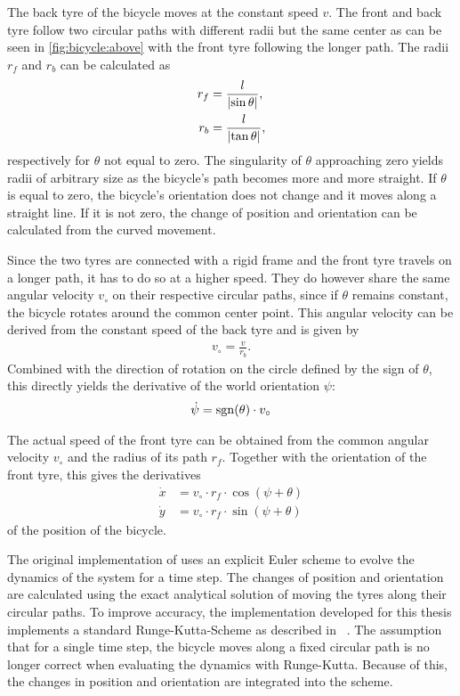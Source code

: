 The back tyre of the bicycle moves at the constant speed $v$.
The front and back tyre follow two circular paths with different radii but the same center as can be seen in \cref{fig:bicycle:above} with the front tyre following the longer path.
The radii $r_f$ and $r_b$ can be calculated as
\begin{align}
    r_f &= \frac{l}{\abs*{\sin \theta}}, \\
    r_b &= \frac{l}{\abs*{\tan \theta}},
\end{align}
respectively for $\theta$ not equal to zero.
The singularity of $\theta$ approaching zero yields radii of arbitrary size as the bicycle's path becomes more and more straight.
If $\theta$ is equal to zero, the bicycle's orientation does not change and it moves along a straight line.
If it is not zero, the change of position and orientation can be calculated from the curved movement.

Since the two tyres are connected with a rigid frame and the front tyre travels on a longer path, it has to do so at a higher speed.
They do however share the same angular velocity $v_\circ$ on their respective circular paths, since if $\theta$ remains constant, the bicycle rotates around the common center point.
This angular velocity can be derived from the constant speed of the back tyre and is given by
\begin{align}
    v_\circ = \frac{v}{r_b}.
\end{align}
Combined with the direction of rotation on the circle defined by the sign of $\theta$, this directly yields the derivative of the world orientation $\psi$:
\begin{align}
    \dot{\psi} = \sgn(\theta) \cdot v_\circ
\end{align}

The actual speed of the front tyre can be obtained from the common angular velocity $v_\circ$ and the radius of its path $r_f$.
Together with the orientation of the front tyre, this gives the derivatives
\begin{align}
    \dot{x} &= v_\circ \cdot r_f \cdot \cos(\psi + \theta) \\
    \dot{y} &= v_\circ \cdot r_f \cdot \sin(\psi + \theta)
\end{align}
of the position of the bicycle.

The original implementation of \citeauthor{randlov_learning_1998} uses an explicit Euler scheme to evolve the dynamics of the system for a time step.
The changes of position and orientation are calculated using the exact analytical solution of moving the tyres along their circular paths.
To improve accuracy, the implementation developed for this thesis implements a standard Runge-Kutta-Scheme as described in ~\cite{press_numerical_2007}.
The assumption that for a single time step, the bicycle moves along a fixed circular path is no longer correct when evaluating the dynamics with Runge-Kutta.
Because of this, the changes in position and orientation are integrated into the scheme.

